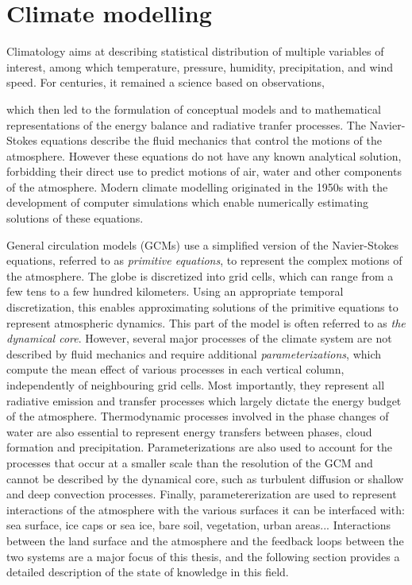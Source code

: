 
\section{Climate modelling}
Climatology aims at describing statistical distribution of multiple variables of interest, among which temperature, pressure, humidity, precipitation, and wind speed.
For centuries, it remained a science based on observations, 

which then led to the formulation of conceptual models and to mathematical representations of the energy balance and radiative tranfer processes.
The Navier-Stokes equations describe the fluid mechanics that control the motions of the atmosphere. However these equations do not have any known analytical solution, forbidding their direct use to predict motions of air, water and other components of the atmosphere. 
Modern climate modelling originated in the 1950s with the development of computer simulations which enable numerically estimating solutions of these equations.

General circulation models (GCMs) use a simplified version of the Navier-Stokes equations, referred to as \textit{primitive equations}, to represent the complex motions of the atmosphere. 
The globe is discretized into grid cells, which can range from a few tens to a few hundred kilometers. Using an appropriate temporal discretization, this enables approximating solutions of the primitive equations to represent atmospheric dynamics. This part of the model is often referred to as \textit{the dynamical core}. However, several major processes of the climate system are not described by fluid mechanics and require additional \textit{parameterizations}, which compute the mean effect of various processes in each vertical column, independently of neighbouring grid cells. Most importantly, they represent all radiative emission and transfer processes which largely dictate the energy budget of the atmosphere.
Thermodynamic processes involved in the phase changes of water are also essential to represent energy transfers between phases, cloud formation and precipitation. Parameterizations are also used to account for the processes that occur at a smaller scale than the resolution of the GCM and cannot be described by the dynamical core, such as turbulent diffusion or shallow and deep convection processes. Finally, parametererization are used to represent interactions of the atmosphere with the various surfaces it can be interfaced with: sea surface, ice caps or sea ice, bare soil, vegetation, urban areas... Interactions between the land surface and the atmosphere and the feedback loops between the two systems are a major focus of this thesis, and the following section %
provides a detailed description of the state of knowledge in this field. 


